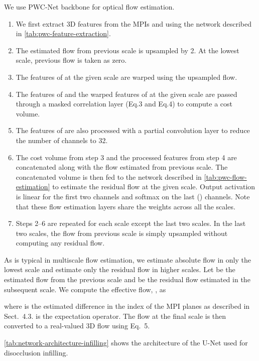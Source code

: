 \documentclass[preprint]{vgtc}
\begin{document}
    We use PWC-Net backbone for optical flow estimation.
    \begin{enumerate}
        \item We first extract 3D features from the MPIs  and  using the network described in \autoref{tab:pwc-feature-extraction}.
        \item The estimated flow from previous scale is upsampled by 2.
        At the lowest scale, previous flow is taken as zero.
        \item The features of  at the given scale are warped using the upsampled flow.
        \item The features of  and the warped features of  at the given scale are passed through a masked correlation layer (Eq.3 and Eq.4) to compute a cost volume.
        \item The features of  are also processed with a  partial convolution layer to reduce the number of channels to 32.
        \item The cost volume from step 3 and the processed features from step 4 are concatenated along with the flow estimated from previous scale.
        The concatenated volume is then fed to the network described in \autoref{tab:pwc-flow-estimation} to estimate the residual flow at the given scale.
        Output activation is linear for the first two channels and softmax on the last () channels.
        Note that these flow estimation layers share the weights across all the scales.
        \item Steps 2--6 are repeated for each scale except the last two scales.
        In the last two scales, the flow from previous scale is simply upsampled without computing any residual flow.
    \end{enumerate}

    As is typical in multiscale flow estimation, we estimate absolute flow in only the lowest scale and estimate only the residual flow in higher scales.
    Let  be the estimated flow from the previous scale and  be the residual flow estimated in the subsequent scale.
We compute the effective flow, , as
    
    where  is the estimated difference in the index of the MPI planes as described in Sect.\ 4.3.
     is the expectation operator.
    The flow at the final scale is then converted to a real-valued 3D flow using Eq.\ 5.

    \autoref{tab:network-architecture-infilling} shows the architecture of the U-Net used for disocclusion infilling.
\end{document}
